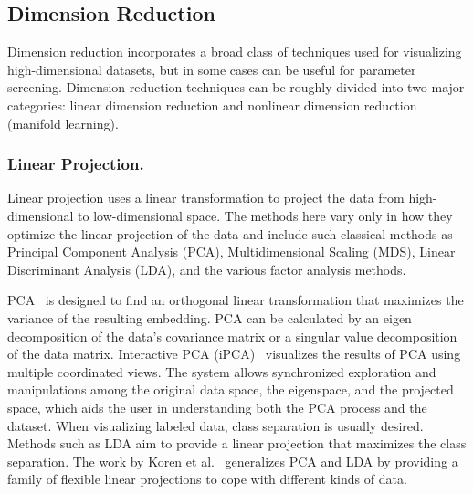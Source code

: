 \subsection{Dimension Reduction}
Dimension reduction incorporates a broad class of techniques used for visualizing high-dimensional datasets, but in some cases can be useful for parameter screening.
%
Dimension reduction techniques can be roughly divided into two major categories: linear dimension reduction and nonlinear dimension reduction (manifold learning).

\subsubsection{Linear Projection.}
Linear projection uses a linear transformation to project the data from high-dimensional to low-dimensional space.
%
The methods here vary only in how they optimize the linear projection of the data and include such classical methods as Principal Component Analysis (PCA), Multidimensional Scaling (MDS), Linear Discriminant Analysis (LDA), and the various factor analysis methods.

PCA~\cite{Jolliffe2005} is designed to find an orthogonal linear transformation that maximizes the variance of the resulting embedding.
%
PCA can be calculated by an eigen decomposition of the data's covariance matrix or a singular value decomposition of the data matrix.
%
Interactive PCA (iPCA)~\cite{JeongZiemkiewiczFisher2009} visualizes the results of PCA using multiple coordinated views.
%
The system allows synchronized exploration and manipulations among the original data space, the eigenspace, and the projected space, which aids the user in understanding both the PCA process and the dataset.
%
When visualizing labeled data, class separation is usually desired.
%
Methods such as LDA aim to provide a linear projection that maximizes the class separation.
%
The work by Koren et al.~\cite{KorenCarmel2003} generalizes PCA and LDA by providing a family of flexible linear projections to cope with different kinds of data.

